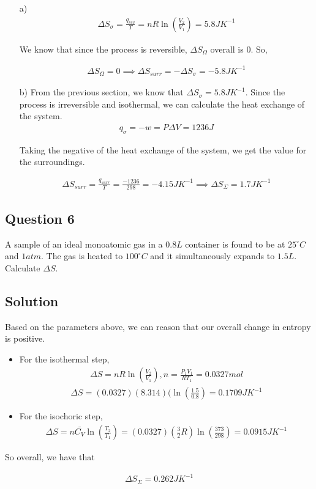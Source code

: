 \documentclass[12pt]{book}
\begin{document}
\begin{itemize}
    \item[a)]
    \begin{align*}
        \Delta S_{\sigma}=\frac{q_{rev}}{T}=nR\ln\left(\frac{V_2}{V_1}\right)=5.8JK^{-1}
    \end{align*}
    
    We know that since the process is reversible, $\Delta S_{\Omega}$ overall is 0. So,
    
    \begin{align*}
        \Delta S_{\Omega}=0\implies \Delta S_{surr}=-\Delta S_{\sigma}=-5.8JK^{-1}
    \end{align*}

    \item[b)] From the previous section, we know that $\Delta S_{\sigma}=5.8JK^{-1}$. Since the process is irreversible and isothermal, we can calculate the heat exchange of the system.
    \begin{align*}
        q_{\sigma}=-w=P\Delta V=1236J
    \end{align*}

    Taking the negative of the heat exchange of the system, we get the value for the surroundings.

    \begin{align*}
        \Delta S_{surr}=\frac{q_{surr}}{T}=\frac{-1236}{298}=-4.15JK^{-1}\implies \Delta S_{\Sigma}=1.7JK^{-1}
    \end{align*}
\end{itemize}

\subsection*{Question 6}

A sample of an ideal monoatomic gas in a $0.8L$ container is found to be at $25^{\circ}C$ and $1atm$. The gas is heated to $100^{\circ}C$ and it simultaneously expands to $1.5L$. Calculate $\Delta S$.

\subsection*{Solution}

Based on the parameters above, we can reason that our overall change in entropy is positive.

\begin{itemize}
    \item For the isothermal step,
    \begin{align*}
        \Delta S=nR\ln\left(\frac{V_2}{V_1}\right),n=\frac{P_1V_1}{RT_1}=0.0327 mol
    \end{align*}
    \begin{align*}
        \Delta S=(0.0327)(8.314)(\ln\left(\frac{1.5}{0.8}\right)=0.1709 JK^{-1}
    \end{align*}
    \item For the isochoric step,
    \begin{align*}
        \Delta S=n\bar{C_V}\ln\left(\frac{T_2}{T_1}\right)=(0.0327)(\frac{3}{2}R)\ln\left(\frac{373}{298}\right)=0.0915JK^{-1}
    \end{align*}
\end{itemize}

So overall, we have that

\begin{align*}
    \Delta S_\Sigma=0.262JK^{-1}
\end{align*}
\end{document}
